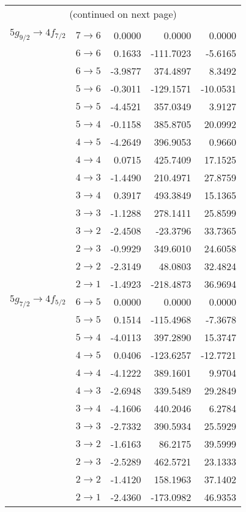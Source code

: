 \begin{longtable}{cc|rrr}
\multicolumn{5}{c}{{(continued on next page)}}\\ \endfoot
\hline \\[-10pt] \hline
\endlastfoot
$5g_{9/2} \rightarrow 4f_{7/2}$ & $7 \rightarrow 6$ &0.0000&0.0000&0.0000\\
 & $6 \rightarrow 6$ &0.1633&-111.7023&-5.6165\\
 & $6 \rightarrow 5$ &-3.9877&374.4897&8.3492\\
 & $5 \rightarrow 6$ &-0.3011&-129.1571&-10.0531\\
 & $5 \rightarrow 5$ &-4.4521&357.0349&3.9127\\
 & $5 \rightarrow 4$ &-0.1158&385.8705&20.0992\\
 & $4 \rightarrow 5$ &-4.2649&396.9053&0.9660\\
 & $4 \rightarrow 4$ &0.0715&425.7409&17.1525\\
 & $4 \rightarrow 3$ &-1.4490&210.4971&27.8759\\
 & $3 \rightarrow 4$ &0.3917&493.3849&15.1365\\
 & $3 \rightarrow 3$ &-1.1288&278.1411&25.8599\\
 & $3 \rightarrow 2$ &-2.4508&-23.3796&33.7365\\
 & $2 \rightarrow 3$ &-0.9929&349.6010&24.6058\\
 & $2 \rightarrow 2$ &-2.3149&48.0803&32.4824\\
 & $2 \rightarrow 1$ &-1.4923&-218.4873&36.9694\\[4pt]
$5g_{7/2} \rightarrow 4f_{5/2}$ & $6 \rightarrow 5$ &0.0000&0.0000&0.0000\\
 & $5 \rightarrow 5$ &0.1514&-115.4968&-7.3678\\
 & $5 \rightarrow 4$ &-4.0113&397.2890&15.3747\\
 & $4 \rightarrow 5$ &0.0406&-123.6257&-12.7721\\
 & $4 \rightarrow 4$ &-4.1222&389.1601&9.9704\\
 & $4 \rightarrow 3$ &-2.6948&339.5489&29.2849\\
 & $3 \rightarrow 4$ &-4.1606&440.2046&6.2784\\
 & $3 \rightarrow 3$ &-2.7332&390.5934&25.5929\\
 & $3 \rightarrow 2$ &-1.6163&86.2175&39.5999\\
 & $2 \rightarrow 3$ &-2.5289&462.5721&23.1333\\
 & $2 \rightarrow 2$ &-1.4120&158.1963&37.1402\\
 & $2 \rightarrow 1$ &-2.4360&-173.0982&46.9353\\

\end{longtable}

